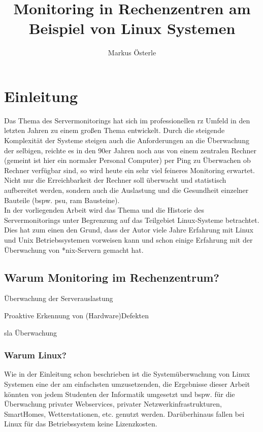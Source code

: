 \documentclass[12pt,a4paper,parskip]{scrreprt}
\author{Markus Österle}
\title{Monitoring in Rechenzentren am Beispiel von Linux Systemen}
\date{} %
\begin{document}
	\maketitle
	\setcounter{tocdepth}{3}
	\tableofcontents
	\onehalfspacing
	\chapter{Einleitung}
Das Thema des Servermonitorings hat sich im professionellen \acrshort{rz} Umfeld in den letzten Jahren zu einem großen Thema entwickelt. Durch die steigende Komplexität der Systeme steigen auch die Anforderungen an die Überwachung der selbigen, reichte es in den 90er Jahren noch aus von einem zentralen Rechner (gemeint ist hier ein normaler Personal Computer) per Ping zu Überwachen ob Rechner verfügbar sind, so wird heute ein sehr viel feineres Monitoring erwartet. Nicht nur die Erreichbarkeit der Rechner soll überwacht und statistisch aufbereitet werden, sondern auch die Auslastung und die Gesundheit einzelner Bauteile (bspw. \gls{psu}, \acrshort{ram} Bausteine). \\

In der vorliegenden Arbeit wird das Thema und die Historie des Servermonitorings unter Begrenzung auf das Teilgebiet Linux-Systeme betrachtet. Dies hat zum einen den Grund, dass der Autor viele Jahre Erfahrung mit Linux und Unix Betriebssystemen vorweisen kann und schon einige Erfahrung mit der Überwachung von *nix-Servern gemacht hat.
	\section{Warum Monitoring im Rechenzentrum?}
	
		Überwachung der Serverauslastung
		
		Proaktive Erkennung von (Hardware)Defekten
		
		\gls{sla} Überwachung
		\subsection{Warum Linux?}
		Wie in der Einleitung schon beschrieben ist die Systemüberwachung von Linux Systemen eine der am einfachsten umzusetzenden, die Ergebnisse dieser Arbeit könnten von jedem Studenten der Informatik umgesetzt und bspw. für die Überwachung privater Webservices, privater Netzwerkinfrastrukturen, SmartHomes, Wetterstationen, etc. genutzt werden. Darüberhinaus fallen bei Linux für das Betriebssystem keine Lizenzkosten.
	
\end{document}
